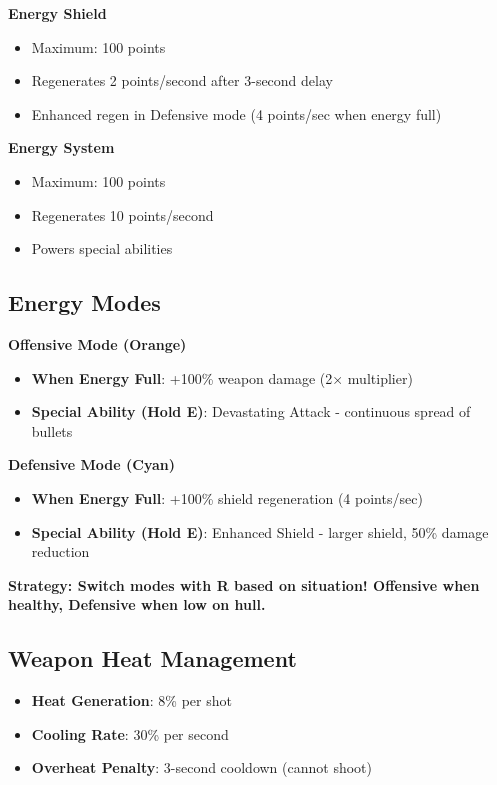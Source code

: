 \documentclass[11pt,a4paper]{article}
\newcommand{\infobox}[2]{%
    \vspace{0.3cm}
    \noindent\colorbox{#1!10}{%
        \parbox{\dimexpr\textwidth-2\fboxsep}{%
            \textcolor{#1}{\textbf{#2}}
        }
    }
    \vspace{0.3cm}
}
\begin{document}
\textbf{Energy Shield}
\begin{itemize}
    \item Maximum: 100 points
    \item Regenerates 2 points/second after 3-second delay
    \item Enhanced regen in Defensive mode (4 points/sec when energy full)
\end{itemize}

\textbf{Energy System}
\begin{itemize}
    \item Maximum: 100 points
    \item Regenerates 10 points/second
    \item Powers special abilities
\end{itemize}

\subsection{Energy Modes}

\textbf{Offensive Mode (Orange)}
\begin{itemize}
    \item \textbf{When Energy Full}: +100\% weapon damage (2× multiplier)
    \item \textbf{Special Ability (Hold E)}: Devastating Attack - continuous spread of bullets
\end{itemize}

\textbf{Defensive Mode (Cyan)}
\begin{itemize}
    \item \textbf{When Energy Full}: +100\% shield regeneration (4 points/sec)
    \item \textbf{Special Ability (Hold E)}: Enhanced Shield - larger shield, 50\% damage reduction
\end{itemize}

\infobox{successcolor}{\textbf{Strategy:} Switch modes with \textbf{R} based on situation! Offensive when healthy, Defensive when low on hull.}

\subsection{Weapon Heat Management}

\begin{itemize}
    \item \textbf{Heat Generation}: 8\% per shot
    \item \textbf{Cooling Rate}: 30\% per second
    \item \textbf{Overheat Penalty}: 3-second cooldown (cannot shoot)
\end{itemize}
\end{document}
